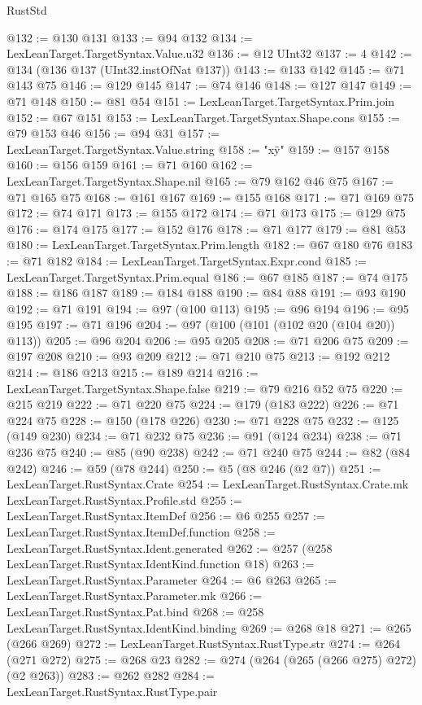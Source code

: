 \begin{lexlean}{RustStd}
\begin{coremodule}
{\begin{coremodule}
{{{{{@132 := @130 @131
@133 := @94 @132
@134 := LexLeanTarget.TargetSyntax.Value.u32
@136 := @12 UInt32
@137 := 4
@142 := @134 (@136 @137 (UInt32.instOfNat @137))
@143 := @133 @142
@145 := @71 @143 @75
@146 := @129 @145
@147 := @74 @146
@148 := @127 @147
@149 := @71 @148
@150 := @81 @54
@151 := LexLeanTarget.TargetSyntax.Prim.join
@152 := @67 @151
@153 := LexLeanTarget.TargetSyntax.Shape.cons
@155 := @79 @153 @46
@156 := @94 @31
@157 := LexLeanTarget.TargetSyntax.Value.string
@158 := "x\"y"
@159 := @157 @158
@160 := @156 @159
@161 := @71 @160
@162 := LexLeanTarget.TargetSyntax.Shape.nil
@165 := @79 @162 @46 @75
@167 := @71 @165 @75
@168 := @161 @167
@169 := @155 @168
@171 := @71 @169 @75
@172 := @74 @171
@173 := @155 @172
@174 := @71 @173
@175 := @129 @75
@176 := @174 @175
@177 := @152 @176
@178 := @71 @177
@179 := @81 @53
@180 := LexLeanTarget.TargetSyntax.Prim.length
@182 := @67 @180 @76
@183 := @71 @182
@184 := LexLeanTarget.TargetSyntax.Expr.cond
@185 := LexLeanTarget.TargetSyntax.Prim.equal
@186 := @67 @185
@187 := @74 @175
@188 := @186 @187
@189 := @184 @188
@190 := @84 @88
@191 := @93 @190
@192 := @71 @191
@194 := @97 (@100 @113)
@195 := @96 @194
@196 := @95 @195
@197 := @71 @196
@204 := @97 (@100 (@101 (@102 @20 (@104 @20)) @113))
@205 := @96 @204
@206 := @95 @205
@208 := @71 @206 @75
@209 := @197 @208
@210 := @93 @209
@212 := @71 @210 @75
@213 := @192 @212
@214 := @186 @213
@215 := @189 @214
@216 := LexLeanTarget.TargetSyntax.Shape.false
@219 := @79 @216 @52 @75
@220 := @215 @219
@222 := @71 @220 @75
@224 := @179 (@183 @222)
@226 := @71 @224 @75
@228 := @150 (@178 @226)
@230 := @71 @228 @75
@232 := @125 (@149 @230)
@234 := @71 @232 @75
@236 := @91 (@124 @234)
@238 := @71 @236 @75
@240 := @85 (@90 @238)
@242 := @71 @240 @75
@244 := @82 (@84 @242)
@246 := @59 (@78 @244)
@250 := @5 (@8 @246 (@2 @7))
@251 := LexLeanTarget.RustSyntax.Crate
@254 := LexLeanTarget.RustSyntax.Crate.mk LexLeanTarget.RustSyntax.Profile.std
@255 := LexLeanTarget.RustSyntax.ItemDef
@256 := @6 @255
@257 := LexLeanTarget.RustSyntax.ItemDef.function
@258 := LexLeanTarget.RustSyntax.Ident.generated
@262 := @257 (@258 LexLeanTarget.RustSyntax.IdentKind.function @18)
@263 := LexLeanTarget.RustSyntax.Parameter
@264 := @6 @263
@265 := LexLeanTarget.RustSyntax.Parameter.mk
@266 := LexLeanTarget.RustSyntax.Pat.bind
@268 := @258 LexLeanTarget.RustSyntax.IdentKind.binding
@269 := @268 @18
@271 := @265 (@266 @269)
@272 := LexLeanTarget.RustSyntax.RustType.str
@274 := @264 (@271 @272)
@275 := @268 @23
@282 := @274 (@264 (@265 (@266 @275) @272) (@2 @263))
@283 := @262 @282
@284 := LexLeanTarget.RustSyntax.RustType.pair
}}}}}
\end{coremodule}}
\end{coremodule}
\end{lexlean}
